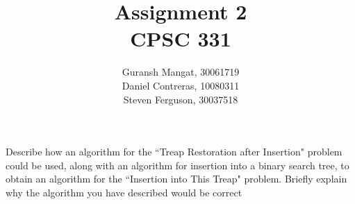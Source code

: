 \documentclass[12pt]{article}
\newenvironment{problem}[2][Problem]{\begin{trivlist}
\item[\hskip \labelsep {\bfseries #1}\hskip \labelsep {\bfseries #2.}]}{\end{trivlist}}
\begin{document}
 

\title{Assignment 2 \\ CPSC 331} %
\author{Guransh Mangat, 30061719 \\ Daniel Contreras, 10080311 \\ Steven Ferguson, 30037518\\}
\date{}


 
\maketitle{}

\newpage

\begin{problem}{1}
Describe how an algorithm for the ``Treap Restoration after Insertion" problem could be
used, along with an algorithm for insertion into a binary search tree, to obtain an algorithm for the ``Insertion into This Treap" problem. Briefly explain why the algorithm you
have described would be correct
\end{problem}
\end{document}
